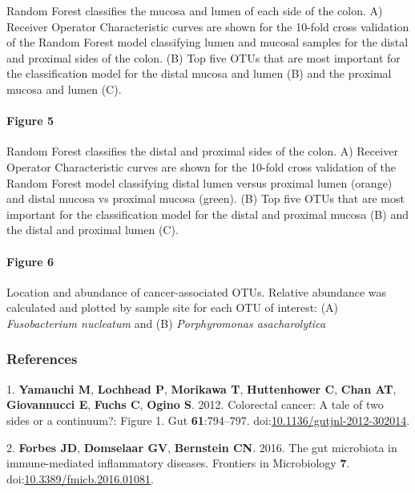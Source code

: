 \documentclass[11pt,]{article}
\let\oldparagraph\paragraph
\renewcommand{\paragraph}[1]{\oldparagraph{#1}\mbox{}}
\begin{document}
Random Forest classifies the mucosa and lumen of each side of the colon.
A) Receiver Operator Characteristic curves are shown for the 10-fold
cross validation of the Random Forest model classifying lumen and
mucosal samples for the distal and proximal sides of the colon. (B) Top
five OTUs that are most important for the classification model for the
distal mucosa and lumen (B) and the proximal mucosa and lumen (C).

\newpage

\paragraph{Figure 5}\label{figure-5}

Random Forest classifies the distal and proximal sides of the colon. A)
Receiver Operator Characteristic curves are shown for the 10-fold cross
validation of the Random Forest model classifying distal lumen versus
proximal lumen (orange) and distal mucosa vs proximal mucosa (green).
(B) Top five OTUs that are most important for the classification model
for the distal and proximal mucosa (B) and the distal and proximal lumen
(C).

\newpage

\paragraph{Figure 6}\label{figure-6}

Location and abundance of cancer-associated OTUs. Relative abundance was
calculated and plotted by sample site for each OTU of interest: (A)
\emph{Fusobacterium nucleatum} and (B) \emph{Porphyromonas
asacharolytica}

\subsubsection*{References}\label{references}

\hypertarget{refs}{}
\hypertarget{ref-Yamauchi2012}{}
1. \textbf{Yamauchi M}, \textbf{Lochhead P}, \textbf{Morikawa T},
\textbf{Huttenhower C}, \textbf{Chan AT}, \textbf{Giovannucci E},
\textbf{Fuchs C}, \textbf{Ogino S}. 2012. Colorectal cancer: A tale of
two sides or a continuum?: Figure 1. Gut \textbf{61}:794--797.
doi:\href{https://doi.org/10.1136/gutjnl-2012-302014}{10.1136/gutjnl-2012-302014}.

\hypertarget{ref-Forbes2016}{}
2. \textbf{Forbes JD}, \textbf{Domselaar GV}, \textbf{Bernstein CN}.
2016. The gut microbiota in immune-mediated inflammatory diseases.
Frontiers in Microbiology \textbf{7}.
doi:\href{https://doi.org/10.3389/fmicb.2016.01081}{10.3389/fmicb.2016.01081}.
\end{document}
